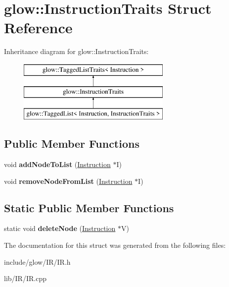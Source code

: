 \hypertarget{structglow_1_1_instruction_traits}{}\section{glow\+:\+:Instruction\+Traits Struct Reference}
\label{structglow_1_1_instruction_traits}
Inheritance diagram for glow\+:\+:Instruction\+Traits\+:\begin{figure}[H]
\begin{center}
\leavevmode
\includegraphics[height=3.000000cm]{structglow_1_1_instruction_traits}
\end{center}
\end{figure}
\subsection*{Public Member Functions}
\begin{DoxyCompactItemize}
\item 
\mbox{\label{structglow_1_1_instruction_traits_ab21a1440366e9fa483f2b04fe5f9defa}} 
void {\bfseries add\+Node\+To\+List} (\hyperlink{classglow_1_1_instruction}{Instruction} $\ast$I)
\item 
\mbox{\label{structglow_1_1_instruction_traits_a69d208718e83734fad61c2d24aa24a6a}} 
void {\bfseries remove\+Node\+From\+List} (\hyperlink{classglow_1_1_instruction}{Instruction} $\ast$I)
\end{DoxyCompactItemize}
\subsection*{Static Public Member Functions}
\begin{DoxyCompactItemize}
\item 
\mbox{\label{structglow_1_1_instruction_traits_ae0e74c0886b0fe979d206211f2129a72}} 
static void {\bfseries delete\+Node} (\hyperlink{classglow_1_1_instruction}{Instruction} $\ast$V)
\end{DoxyCompactItemize}


The documentation for this struct was generated from the following files\+:\begin{DoxyCompactItemize}
\item 
include/glow/\+I\+R/I\+R.\+h\item 
lib/\+I\+R/I\+R.\+cpp\end{DoxyCompactItemize}
